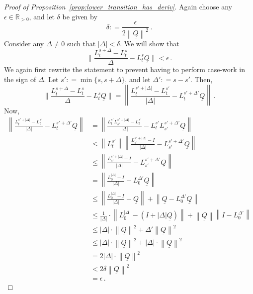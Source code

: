 \documentclass[10pt]{paper}
\theoremstyle{definition}
\newcommand{\reals}{\mathbb{R}}
\newcommand{\realspos}{\reals_{>0}}
\newcommand{\lbound}{L}
\newcommand{\lrate}{\underline{Q}}
\newcommand{\norm}[1]{\left\lVert #1 \right\rVert}
\newcommand{\coloneqq}{:\!=}
\begin{document}
\begin{proof}[Proof of Proposition~\ref{prop:lower_transition_has_deriv}]
Again choose any $\epsilon\in\realspos$, and let $\delta$ be given by
\begin{equation*}
\delta \coloneqq \frac{\epsilon}{2\norm{\lrate}^2}\,.
\end{equation*}
Consider any $\Delta\neq 0$ such that $\lvert\Delta\rvert<\delta$. We will show that
\begin{equation*}
\Big\lVert\frac{L_{t}^{s+\Delta}-L_t^s}{\Delta}-\lbound_t^s\lrate \Big\rVert<\epsilon\,.
\end{equation*}
We again first rewrite the statement to prevent having to perform case-work in the sign of $\Delta$. Let $s'\coloneqq\min\{s,s+\Delta\}$, and let $\Delta'\coloneqq s-s'$. Then,
\begin{equation*}
\Big\lVert\frac{L_{t}^{s+\Delta}-L_t^s}{\Delta}-\lbound_t^s\lrate \Big\rVert = \norm{\frac{L_t^{s'+\lvert\Delta\rvert} - L_t^{s'}}{\lvert\Delta\rvert} - L_t^{s'+\Delta'}\lrate}\,.
\end{equation*}
Now,
\begin{align*}
\norm{\frac{L_t^{s'+\lvert\Delta\rvert} - L_t^{s'}}{\lvert\Delta\rvert} - L_t^{s'+\Delta'}\lrate} &= \norm{\frac{L_t^{s'}L_{s'}^{s'+\lvert\Delta\rvert} - L_t^{s'}}{\lvert\Delta\rvert} - L_t^{s'}L_{s'}^{s'+\Delta'}\lrate} \\
 &\leq \norm{L_t^{s'}}\norm{\frac{L_{s'}^{s'+\lvert\Delta\rvert} - I}{\lvert\Delta\rvert} - L_{s'}^{s'+\Delta'}\lrate} \\
 &\leq \norm{\frac{L_{s'}^{s'+\lvert\Delta\rvert} - I}{\lvert\Delta\rvert} - L_{s'}^{s'+\Delta'}\lrate} \\
 &= \norm{\frac{L_{0}^{\lvert\Delta\rvert} - I}{\lvert\Delta\rvert} - L_{0}^{\Delta'}\lrate} \\
 &\leq \norm{\frac{L_{0}^{\lvert\Delta\rvert} - I}{\lvert\Delta\rvert} - \lrate} + \norm{\lrate - L_{0}^{\Delta'}\lrate} \\
 &\leq \frac{1}{\lvert\Delta\rvert}\cdot\norm{L_{0}^{\lvert\Delta\rvert} - (I+\lvert\Delta\rvert\lrate)} + \norm{\lrate}\norm{I - L_{0}^{\Delta'}} \\
 &\leq \lvert\Delta\rvert\cdot\norm{\lrate}^2 + \Delta'\norm{\lrate}^2 \\
 &\leq \lvert\Delta\rvert\cdot\norm{\lrate}^2 + \lvert\Delta\rvert\cdot\norm{\lrate}^2 \\
 &= 2\lvert\Delta\rvert\cdot\norm{\lrate}^2 \\
 &< 2\delta\norm{\lrate}^2 \\
 &= \epsilon\,.
\end{align*}


\end{proof}
\end{document}
